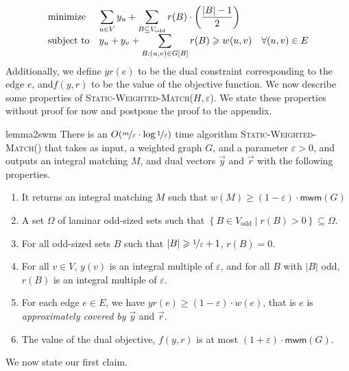 \documentclass[a4paper,11pt]{article}
\newcommand{\card}[1]{|#1|}
\newcommand{\paren}[1]{\left ( #1 \right )}
\newcommand{\set}[1]{\ensuremath{\left\{ #1 \right\}}}
\newcommand{\eps}{\varepsilon}
\theoremstyle{definition}
\theoremstyle{definition}
\theoremstyle{definition}
\theoremstyle{definition}
\theoremstyle{definition}
\theoremstyle{definition}
\theoremstyle{definition}
\theoremstyle{definition}
\theoremstyle{definition}
\theoremstyle{definition}
\theoremstyle{definition}
\theoremstyle{definition}
\theoremstyle{definition}
\theoremstyle{definition}
\theoremstyle{definition}
\begin{document}
\begin{equation*}
\begin{array}{ll@{}ll}
\text{minimize}  & \displaystyle\sum\limits_{u\in V} y_u +\sum_{B\subseteq V_{\text{odd}}} r(B)\cdot \paren{\frac{\card{B}-1}{2}} \\
\text{subject to}& \displaystyle y_{u}+y_{v}+ \sum\limits_{B: (u,v)\in G[B]} r(B)\geqslant w(u,v) & & \forall (u,v)\in E 
\end{array}
\end{equation*}
Additionally, we define $yr(e)$ to be the dual constraint corresponding to the edge $e$, and$f(y,r)$ to be the value of the objective function. We now describe some properties of \textsc{Static-Weighted-Match}($H,\eps$). We state these properties without proof for now and postpone the proof to the appendix. 
\begin{restatable}{lemma2}{swm}\label{lem:mwm}\cite{DP14}
There is an $O(\nicefrac{m}{\eps}\cdot \log \nicefrac{1}{\eps})$ time algorithm \textsc{Static-Weighted-Match}() that takes as input, a weighted graph $G$, and a parameter $\eps>0$, and outputs an integral matching $M$, and dual vectors $\vec{y}$ and $\vec{r}$ with the following properties.
\begin{enumerate}
\item It returns an integral matching $M$ such that $w(M)\geqslant (1-\eps)\cdot \textsf{mwm}(G)$ \label{item:mwma}
\item A set $\Omega$ of laminar odd-sized sets such that $\set{B\in V_{\text{odd}}\mid r(B)>0}\subseteq \Omega$. \label{item:mwmb}
\item For all odd-sized sets $B$ such that $\card{B}\geqslant \nicefrac{1}{\eps}+1$, $r(B)=0$. \label{item:mwmc}
\item For all $v\in V$, $y(v)$ is an integral multiple of $\eps$, and for all $B$ with $\card{B}$ odd, $r(B)$ is an integral multiple of $\eps$. \label{item:mwmd}
\item For each edge $e\in E$, we have $yr(e)\geqslant (1-\eps)\cdot w(e)$, that is $e$ is \emph{approximately covered by} $\vec{y}$ and $\vec{r}$. \label{item:mwme}
\item The value of the dual objective, $f(y,r)$ is at most $(1+\eps)\cdot \textsf{mwm}(G)$. \label{item:mwmf}
\end{enumerate}
\end{restatable}

We now state our first claim. 
\end{document}
